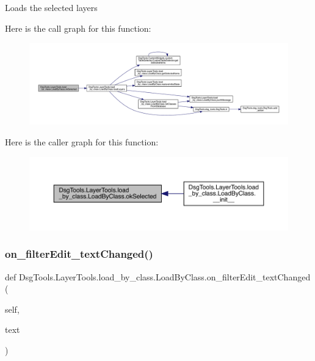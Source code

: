 \begin{DoxyVerb}Loads the selected layers
\end{DoxyVerb}
 Here is the call graph for this function\+:
\nopagebreak
\begin{figure}[H]
\begin{center}
\leavevmode
\includegraphics[width=350pt]{class_dsg_tools_1_1_layer_tools_1_1load__by__class_1_1_load_by_class_adc722a26fb632875f143b4dbf6544d36_cgraph}
\end{center}
\end{figure}
Here is the caller graph for this function\+:
\nopagebreak
\begin{figure}[H]
\begin{center}
\leavevmode
\includegraphics[width=350pt]{class_dsg_tools_1_1_layer_tools_1_1load__by__class_1_1_load_by_class_adc722a26fb632875f143b4dbf6544d36_icgraph}
\end{center}
\end{figure}
\mbox{\label{class_dsg_tools_1_1_layer_tools_1_1load__by__class_1_1_load_by_class_a9668940bfcdd2e6083191f06e080b3fd}} 
\subsubsection{\texorpdfstring{on\+\_\+filter\+Edit\+\_\+text\+Changed()}{on\_filterEdit\_textChanged()}}
{\footnotesize\ttfamily def Dsg\+Tools.\+Layer\+Tools.\+load\+\_\+by\+\_\+class.\+Load\+By\+Class.\+on\+\_\+filter\+Edit\+\_\+text\+Changed (\begin{DoxyParamCaption}\item[{}]{self,  }\item[{}]{text }\end{DoxyParamCaption})}

